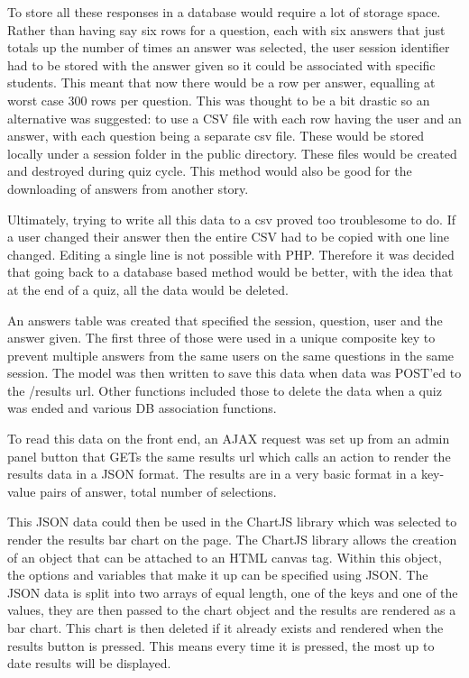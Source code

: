 To store all these responses in a database would require a lot of storage space. Rather than having say six rows for a question, each with six answers that just totals up the number of times an answer was selected, the user session identifier had to be stored with the answer given so it could be associated with specific students. This meant that now there would be a row per answer, equalling at worst case 300 rows per question. This was thought to be a bit drastic so an alternative was suggested: to use a CSV file with each row having the user and an answer, with each question being a separate csv file. These would be stored locally under a session folder in the public directory. These files would be created and destroyed during quiz cycle. This method would also be good for the downloading of answers from another story. 

Ultimately, trying to write all this data to a csv proved too troublesome to do. If a user changed their answer then the entire CSV had to be copied with one line changed. Editing a single line is not possible with PHP. Therefore it was decided that going back to a database based method would be better, with the idea that at the end of a quiz, all the data would be deleted.

An answers table was created that specified the session, question, user and the answer given. The first three of those were used in a unique composite key to prevent multiple answers from the same users on the same questions in the same session. The model was then written to save this data when data was POST'ed to the /results url. Other functions included those to delete the data when a quiz was ended and various DB association functions.

To read this data on the front end, an AJAX request was set up from an admin panel button that GETs the same results url which calls an action to render the results data in a JSON format. The results are in a very basic format in a key-value pairs of answer, total number of selections.

This JSON data could then be used in the ChartJS library which was selected to render the results bar chart on the page\cite{chartjs}. The ChartJS library allows the creation of an object that can be attached to an HTML canvas tag. Within this object, the options and variables that make it up can be specified using JSON. The JSON data is split into two arrays of equal length, one of the keys and one of the values, they are then passed to the chart object and the results are rendered as a bar chart. This chart is then deleted if it already exists and rendered when the results button is pressed. This means every time it is pressed, the most up to date results will be displayed. 
